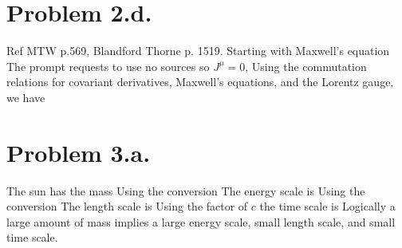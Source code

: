 \documentclass{article}
\begin{document}
\section*{Problem 2.d.}
Ref MTW p.569, Blandford Thorne p. 1519. Starting with Maxwell's equation
The prompt requests to use no sources so $J^\mu=0$,
Using the commutation relations for covariant derivatives, Maxwell's equations, and the Lorentz gauge, we have
\section*{Problem 3.a.}
The sun has the mass
Using the conversion
The energy scale is
Using the conversion
The length scale is
Using the factor of $c$ the time scale is
Logically a large amount of mass implies a large energy scale, small length scale, and small time scale.
\end{document}
